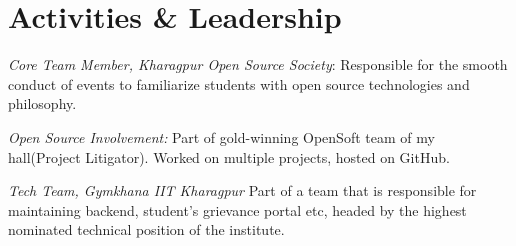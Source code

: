 \documentclass[]{deedy-resume-openfont}
\begin{document}
\begin{minipage}[t]{0.66\textwidth}
\section{Activities \& Leadership}

\vspace{\topsep} %
\begin{tightemize}


\item {\emph{Core Team Member, Kharagpur Open Source Society}:} Responsible for the smooth conduct of events to familiarize students with open source technologies and philosophy.\\
\item{\emph{Open Source Involvement:}} Part of gold-winning OpenSoft team of my hall(Project Litigator). Worked on multiple projects, hosted on GitHub. \\
\item{\emph{Tech Team, Gymkhana IIT Kharagpur}} Part of a team that is responsible for maintaining backend, student’s grievance portal etc, headed by the highest nominated technical position of the institute.

\end{tightemize}
\sectionsep

\end{minipage} 
\end{document}
